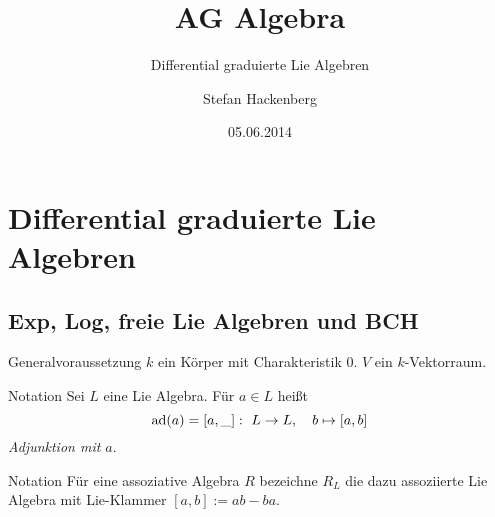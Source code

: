 \documentclass{vorlage}
\title{AG Algebra}
\subtitle{Differential graduierte Lie Algebren}
\author{Stefan Hackenberg}
\date{05.06.2014}
\begin{document}


\begin{frame}
  \maketitle
\end{frame}


\section{Differential graduierte Lie Algebren}
\subsection{Exp, Log, freie Lie Algebren und BCH}

\begin{frame}[<+->]
  \begin{block}{Generalvoraussetzung} $k$ ein Körper mit Charakteristik $0$.
    $V$ ein $k$-Vektorraum.
  \end{block}
  \begin{block}{Notation}
    Sei $L$ eine Lie Algebra. Für $a\in L$ heißt
    \[ \operatorname{ad}(a) = [a,\_]:\ L \to L,\quad b \mapsto [a,b]\]
    \emph{Adjunktion mit $a$}.
  \end{block}
  \begin{block}{Notation}
    Für eine assoziative Algebra $R$ bezeichne $R_L$ die dazu assoziierte Lie
    Algebra mit Lie-Klammer $[a,b] := ab -ba$.
  \end{block}
\end{frame}
\end{document}
